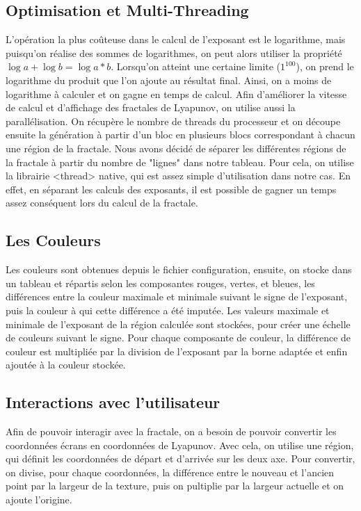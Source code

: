 \documentclass{article}
\begin{document}
	\subsection{Optimisation et Multi-Threading}

	L'opération la plus coûteuse dans le calcul de l'exposant est le logarithme, mais puisqu'on réalise des sommes de logarithmes, on peut alors utiliser la propriété $\log{a} + \log{b} = \log{a * b}$.
	Lorsqu'on atteint une certaine limite ($1^{100}$), on prend le logarithme du produit que l'on ajoute au résultat final.
	Ainsi, on a moins de logarithme à calculer et on gagne en temps de calcul.
	Afin d'améliorer la vitesse de calcul et d'affichage des fractales de Lyapunov, on utilise aussi la parallélisation.
	On récupère le nombre de threads du processeur et on découpe ensuite la génération à partir d'un bloc en plusieurs blocs correspondant à chacun une région de la fractale.
	Nous avons décidé de séparer les différentes régions de la fractale à partir du nombre de "lignes" dans notre tableau.
	Pour cela, on utilise la librairie <thread> native, qui est assez simple d'utilisation dans notre cas.
	En effet, en séparant les calculs des exposants, il est possible de gagner un temps assez conséquent lors du calcul de la fractale.

	\subsection{Les Couleurs}

	Les couleurs sont obtenues depuis le fichier configuration, ensuite, on stocke dans un tableau et répartis selon les composantes rouges, vertes, et bleues, les différences entre la couleur maximale et minimale suivant le signe de l'exposant, puis la couleur à qui cette différence a été imputée.
	Les valeurs maximale et minimale de l'exposant de la région calculée sont stockées, pour créer une échelle de couleurs suivant le signe.
	Pour chaque composante de couleur, la différence de couleur est multipliée par la division de l'exposant par la borne adaptée et enfin ajoutée à la couleur stockée.

	\subsection{Interactions avec l'utilisateur}

	Afin de pouvoir interagir avec la fractale, on a besoin de pouvoir convertir les coordonnées écrans en coordonnées de Lyapunov.
	Avec cela, on utilise une région, qui définit les coordonnées de départ et d'arrivée sur les deux axe.
	Pour convertir, on divise, pour chaque coordonnées, la différence entre le nouveau et l'ancien point par la largeur de la texture, puis on pultiplie par la largeur actuelle et on ajoute l'origine.
\end{document}

